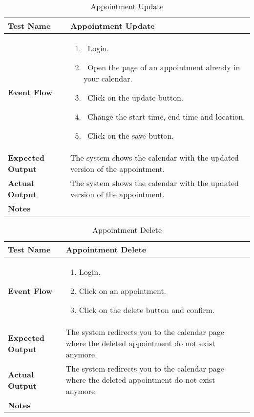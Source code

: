 \begin{table}[h]	
\centering
\def\arraystretch{1.5}
\begin{tabular}{|m{7cm}|m{7cm}|}
	\hline
	\textbf{Test Name}            &  Appointment Update  \\ \hline
	\textbf{Event Flow}             & 
		\begin{enumerate}
			\item~Login.
			\item~Open the page of an appointment already in your calendar.
			\item~Click on the update button.
			\item~Change the start time, end time and location.
			\item~Click on the save button.
		\end{enumerate}
	\\ \hline
	\textbf{Expected Output}  &  The system shows the calendar with the updated version of the appointment.   \\ \hline
	\textbf{Actual Output}       &  The system shows the calendar with the updated version of the appointment.   \\ \hline
	\textbf{Notes} & \\ \hline
\end{tabular}
\caption{Appointment Update}
\end{table}


\begin{table}[h]	
	\centering
	\def\arraystretch{1.5}
	\begin{tabular}{|m{7cm}|m{7cm}|}
		\hline
		\textbf{Test Name}            & Appointment Delete   \\ \hline
		\textbf{Event Flow}             & 
		\begin{enumerate}
			\item Login.
			\item Click on an appointment.
			\item Click on the delete button and confirm.
		\end{enumerate} \\ \hline
		\textbf{Expected Output}  &  The system redirects you to the calendar page where the deleted appointment do not exist anymore.  \\ \hline
		\textbf{Actual Output}       & The system redirects you to the calendar page where the deleted appointment do not exist anymore.    \\ \hline
		\textbf{Notes} & \\ \hline
	\end{tabular}
	\caption{Appointment Delete}
\end{table}


